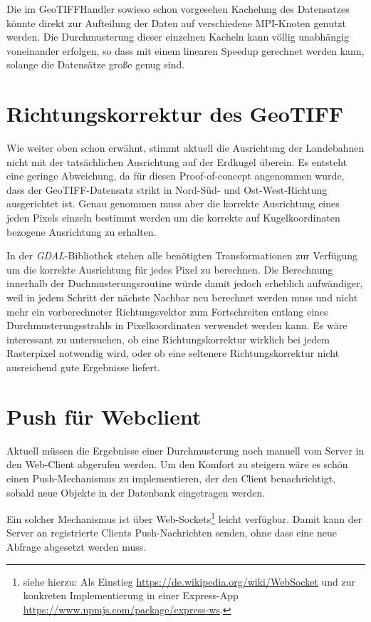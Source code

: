 \documentclass[10pt,a4paper]{report}
\begin{document}
Die im GeoTIFFHandler sowieso schon vorgesehen Kachelung des Datensatzes könnte direkt zur Aufteilung der Daten auf verschiedene MPI-Knoten genutzt werden. Die Durchmusterung dieser einzelnen Kacheln kann völlig unabhängig voneinander erfolgen, so dass mit einem linearen Speedup gerechnet werden kann, solange die Datensätze große genug sind.

\section{Richtungskorrektur des GeoTIFF}

Wie weiter oben schon erwähnt, stimmt aktuell die Ausrichtung der Landebahnen nicht mit der tatsächlichen Ausrichtung auf der Erdkugel überein. Es entsteht eine geringe Abweichung, da für diesen Proof-of-concept angenommen wurde, dass der GeoTIFF-Datensatz strikt in Nord-Süd- und Ost-West-Richtung ausgerichtet ist. Genau genommen muss aber die korrekte Ausrichtung eines jeden Pixels einzeln bestimmt werden um die korrekte auf Kugelkoordinaten bezogene Ausrichtung zu erhalten.

In der \emph{GDAL}-Bibliothek stehen alle benötigten Transformationen zur Verfü\-gung um die korrekte Ausrichtung für jedes Pixel zu berechnen. Die Berechnung innerhalb der Duchmusterungsroutine würde damit jedoch erheblich aufwändiger, weil in jedem Schritt der nächste Nachbar neu berechnet werden muss und nicht mehr ein vorberechneter Richtungsvektor zum Fortschreiten entlang eines Durchmusterungsstrahls in Pixelkoordinaten verwendet werden kann. Es wäre interessant zu untersuchen, ob eine Richtungskorrektur wirklich bei jedem Rasterpixel notwendig wird, oder ob eine seltenere Richtungskorrektur nicht ausreichend gute Ergebnisse liefert.

\section{Push für Webclient}
Aktuell müssen die Ergebnisse einer Durchmusterung noch manuell vom Server in den Web-Client abgerufen werden. Um den Komfort zu steigern wäre es schön einen Push-Mechanismus zu implementieren, der den Client benachrichtigt, sobald neue Objekte in der Datenbank eingetragen werden.

Ein solcher Mechanismus ist über Web-Sockets\footnote{siehe hierzu: Als Einstieg \href{https://de.wikipedia.org/wiki/WebSocket}{https://de.wikipedia.org/wiki/WebSocket} und zur konkreten Implementierung in einer Express-App  \href{https://www.npmjs.com/package/express-ws}{https://www.npmjs.com/package/express-ws}.} leicht verfügbar. Damit kann der Server an registrierte Clients Push-Nachrichten senden, ohne dass eine neue Abfrage abgesetzt werden muss.
\end{document}
